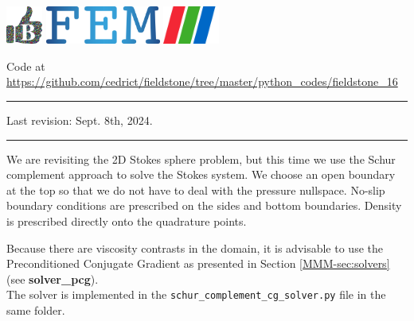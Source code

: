 \noindent
\includegraphics[height=1.25cm]{images/pictograms/benchmark}
\includegraphics[height=1.25cm]{images/pictograms/FEM}
\includegraphics[height=1.25cm]{images/pictograms/paraview}

%

\begin{center}
\inpython \hspace{.5cm}
{\small Code at \url{https://github.com/cedrict/fieldstone/tree/master/python_codes/fieldstone_16}}
\end{center}

\par\noindent\rule{\textwidth}{0.4pt}

Last revision: Sept. 8th, 2024.

\par\noindent\rule{\textwidth}{0.4pt}

We are revisiting the 2D Stokes sphere problem, but this time 
we use the Schur complement approach to solve the Stokes system. 
We choose an open boundary at the top so that we do not have to deal with the pressure 
nullspace. No-slip boundary conditions are prescribed on the sides and bottom boundaries.
Density is prescribed directly onto the quadrature points. 

Because there are viscosity contrasts in the domain, it is advisable 
to use the Preconditioned Conjugate Gradient 
as presented in Section \ref{MMM-sec:solvers} (see {\bf solver\_pcg}).\\
The solver is implemented in the {\tt schur\_complement\_cg\_solver.py} file in the same folder.  


